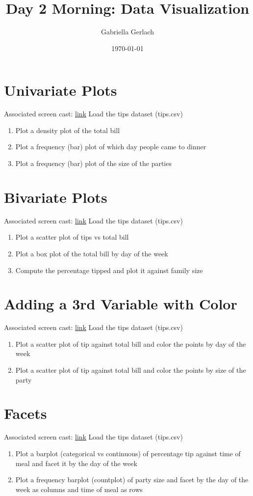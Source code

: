 \documentclass{article}
\title{Day 2 Morning: Data Visualization}
\author{Gabriella Gerlach}
\date{\today}
\begin{document}
\maketitle
\section{Univariate Plots}
Associated screen cast: \href{https://www.youtube.com/watch?v=ZVF-IAq6XxM}{link}
Load the tips dataset (tips.csv)
\begin{enumerate}
		\item Plot a density plot of the total bill
		\item Plot a frequency (bar) plot of which day people came to dinner
		\item Plot a frequency (bar) plot of the size of the parties 
\end{enumerate}

\section{Bivariate Plots}
Associated screen cast: \href{https://www.youtube.com/watch?v=9pjPoLc75XI}{link}
Load the tips dataset (tips.csv)
\begin{enumerate}
		\item Plot a scatter plot of tips vs total bill
		\item Plot a box plot of the total bill by day of the week
		\item Compute the percentage tipped and plot it against family size 
\end{enumerate}

\section{Adding a 3rd Variable with Color}
Associated screen cast: \href{https://www.youtube.com/watch?v=MakwFVOKTr0}{link}
Load the tips dataset (tips.csv)
\begin{enumerate}
		\item Plot a scatter plot of tip against total bill and color the points by day of the week
		\item Plot a scatter plot of tip against total bill and color the points by size of the party
\end{enumerate}
\section{Facets}
Associated screen cast: \href{https://www.youtube.com/watch?v=omeMx49brqM}{link}
Load the tips dataset (tips.csv)
\begin{enumerate}
		\item Plot a barplot (categorical vs continuous) of percentage tip against time of meal and facet it by the day of the week
		\item Plot a frequency barplot (countplot) of party size and facet by the day of the week as columns and time of meal as rows
\end{enumerate}
\end{document}
